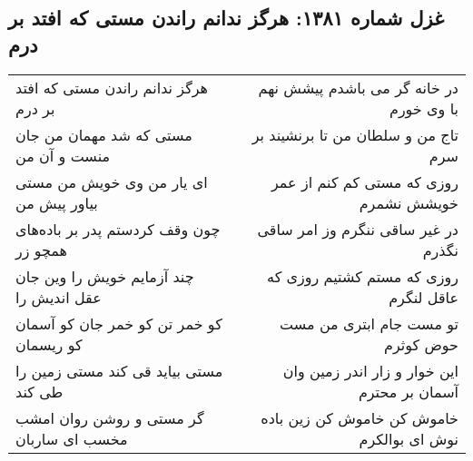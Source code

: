\begin{center}
\section*{غزل شماره ۱۳۸۱: هرگز ندانم راندن مستی که افتد بر درم}
\label{sec:1381}
\begin{longtable}{l p{0.5cm} r}
هرگز ندانم راندن مستی که افتد بر درم
&&
در خانه گر می باشدم پیشش نهم با وی خورم
\\
مستی که شد مهمان من جان منست و آن من
&&
تاج من و سلطان من تا برنشیند بر سرم
\\
ای یار من وی خویش من مستی بیاور پیش من
&&
روزی که مستی کم کنم از عمر خویشش نشمرم
\\
چون وقف کردستم پدر بر باده‌های همچو زر
&&
در غیر ساقی ننگرم وز امر ساقی نگذرم
\\
چند آزمایم خویش را وین جان عقل اندیش را
&&
روزی که مستم کشتیم روزی که عاقل لنگرم
\\
کو خمر تن کو خمر جان کو آسمان کو ریسمان
&&
تو مست جام ابتری من مست حوض کوثرم
\\
مستی بیاید قی کند مستی زمین را طی کند
&&
این خوار و زار اندر زمین وان آسمان بر محترم
\\
گر مستی و روشن روان امشب مخسب ای ساربان
&&
خاموش کن خاموش کن زین باده نوش ای بوالکرم
\\
\end{longtable}
\end{center}
